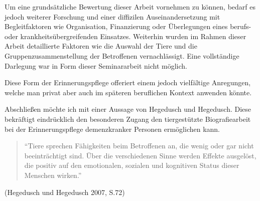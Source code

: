 Um eine grundsätzliche Bewertung dieser Arbeit vornehmen zu können, bedarf es jedoch weiterer Forschung und einer diffizilen Auseinandersetzung mit Begleitfaktoren wie Organisation, Finanzierung oder Überlegungen eines berufs- oder krankheitsübergreifenden Einsatzes. Weiterhin wurden im Rahmen dieser Arbeit detaillierte Faktoren wie die Auswahl der Tiere und die Gruppenzusammenstellung der Betroffenen vernachlässigt. Eine vollständige Darlegung war in Form dieser Seminararbeit nicht möglich. 

Diese Form der Erinnerungspflege offeriert einem jedoch vielfältige Anregungen, welche man privat aber auch im späteren beruflichen Kontext anwenden könnte.

Abschließen möchte ich mit einer Aussage von Hegedusch und Hegedusch. Diese bekräftigt eindrücklich den besonderen Zugang den tiergestützte Biografiearbeit bei der Erinnerungspflege demenzkranker Personen ermöglichen kann.

\begin{quotation}
"`Tiere sprechen Fähigkeiten beim Betroffenen an, die wenig oder gar nicht beeinträchtigt sind. Über die verschiedenen Sinne werden Effekte ausgelöst, die positiv auf den emotionalen, sozialen und kognitiven Status dieser Menschen wirken."'
\end{quotation}
\begin{flushright}
(Hegedusch und Hegedusch 2007, S.72)
\end{flushright}